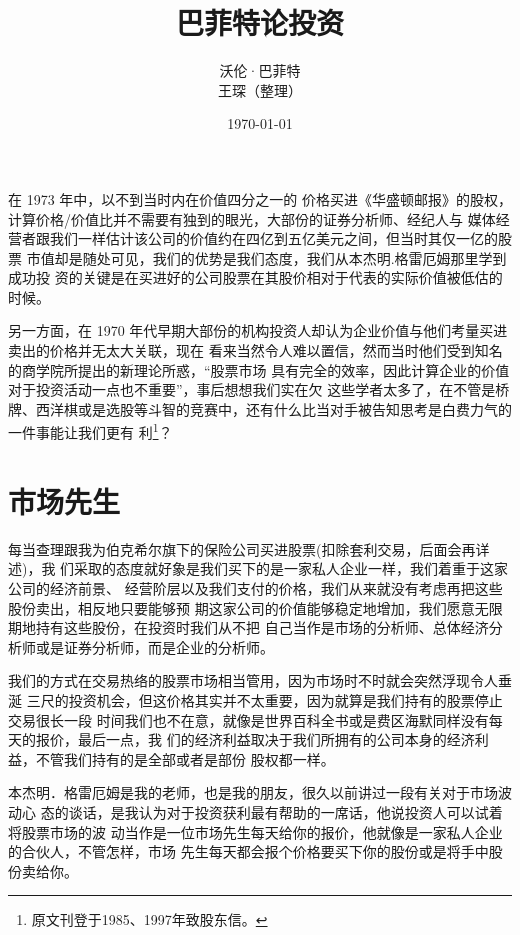 \documentclass[UTF8,a4paper,zihao=-4,fontset = windows]{ctexart} %
\title{\textbf{巴菲特论投资}} %
\author{沃伦·巴菲特   \\
        王琛（整理）}
\date{\today}
\begin{document}
\maketitle
\tableofcontents
\newpage

在 1973 年中，以不到当时内在价值四分之一的
价格买进《华盛顿邮报》的股权，计算价格/价值比并不需要有独到的眼光，大部份的证券分析师、经纪人与
媒体经营者跟我们一样估计该公司的价值约在四亿到五亿美元之间，但当时其仅一亿的股票
市值却是随处可见，我们的优势是我们态度，我们从本杰明.格雷厄姆那里学到成功投
资的关键是在买进好的公司股票在其股价相对于代表的实际价值被低估的时候。

另一方面，在 1970 年代早期大部份的机构投资人却认为企业价值与他们考量买进卖出的价格并无太大关联，现在
看来当然令人难以置信，然而当时他们受到知名的商学院所提出的新理论所惑，“股票市场
具有完全的效率，因此计算企业的价值对于投资活动一点也不重要”，事后想想我们实在欠
这些学者太多了，在不管是桥牌、西洋棋或是选股等斗智的竞赛中，还有什么比当对手被告知思考是白费力气的一件事能让我们更有
利\footnote{原文刊登于1985、1997年致股东信。}？

\section{市场先生}

每当查理跟我为伯克希尔旗下的保险公司买进股票(扣除套利交易，后面会再详述)，我
们采取的态度就好象是我们买下的是一家私人企业一样，我们着重于这家公司的经济前景、
经营阶层以及我们支付的价格，我们从来就没有考虑再把这些股份卖出，相反地只要能够预
期这家公司的价值能够稳定地增加，我们愿意无限期地持有这些股份，在投资时我们从不把
自己当作是市场的分析师、总体经济分析师或是证券分析师，而是企业的分析师。

我们的方式在交易热络的股票市场相当管用，因为市场时不时就会突然浮现令人垂涎
三尺的投资机会，但这价格其实并不太重要，因为就算是我们持有的股票停止交易很长一段
时间我们也不在意，就像是世界百科全书或是费区海默同样没有每天的报价，最后一点，我
们的经济利益取决于我们所拥有的公司本身的经济利益，不管我们持有的是全部或者是部份
股权都一样。

本杰明．格雷厄姆是我的老师，也是我的朋友，很久以前讲过一段有关对于市场波动心
态的谈话，是我认为对于投资获利最有帮助的一席话，他说投资人可以试着将股票市场的波
动当作是一位市场先生每天给你的报价，他就像是一家私人企业的合伙人，不管怎样，市场
先生每天都会报个价格要买下你的股份或是将手中股份卖给你。
\end{document}
